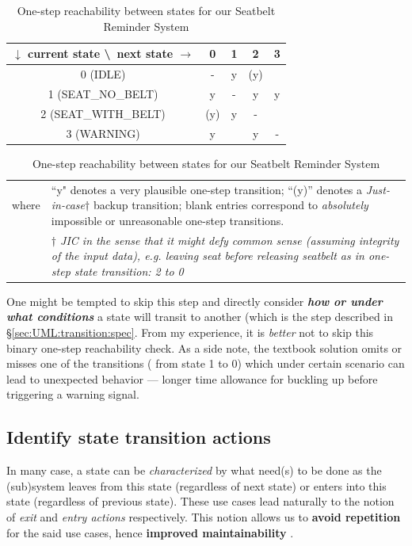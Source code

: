 \documentclass[12pt,a4paper]{scrartcl}
\begin{document}
	\begin{table}[ht]
		\centering
		\caption{One-step reachability between states for our Seatbelt Reminder System}
		\begin{tabular}{|c||c|c|c|c|} \hline
			$\downarrow$ current state \textbackslash \ next state $\rightarrow$ 
			& 0 & 1 & 2 & 3\\ \hline
			0 (IDLE) & - & y & (y) & \\
			1 (SEAT\_NO\_BELT) & {\color{red}y} & - & y & y\\
			2 (SEAT\_WITH\_BELT) & (y) & y & - & \\
			3 (WARNING) & y & & y & -\\ \hline
		\end{tabular}
		\label{tab:OneStepTransition}
		
		
		\vspace{1em}
		\begin{tabular}{p{1cm} p{10cm}}
			where & 
		 ``y" denotes a very plausible one-step transition; 
		 \newline 
		``(y)'' denotes a \textit{Just-in-case}$\dagger$ backup transition; 
		\newline
		blank entries correspond to \textit{absolutely} impossible or unreasonable one-step transitions. 		\\
		& 
		\textit{$\dagger$ JIC in the sense that it might defy common sense (assuming integrity of the input data), e.g. leaving seat before releasing seatbelt as in one-step state transition: 2 to 0}
		\end{tabular}	
	\end{table}

	
	One might be tempted to skip this step and directly consider \textbf{\emph{how or under what conditions}} a state will transit to another (which is the step described in \S \ref{sec:UML:transition:spec}.	
	From my experience, it is \textit{better} not to skip this binary one-step reachability check.
	As a side note, the textbook solution omits or misses one of the transitions ({\color{red} from state 1 to 0}) which under certain scenario can lead to unexpected behavior --- longer time allowance for buckling up before triggering a warning signal.
			
	\subsection{Identify state transition actions}	\label{sec:UML:during_entry_exit}
		In many case, a state can be \textit{characterized} by what need(s) to be done as the (sub)system 
		leaves from this state (regardless of next state) or 
		enters into this state (regardless of previous state).
		These use cases lead naturally to the notion of \textit{exit} and \textit{entry actions} respectively. 
		This notion allows us to \textbf{avoid repetition} for the said use cases, hence \textbf{improved maintainability} \cite{Samek}. 
		
\end{document}
